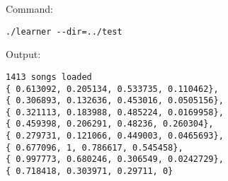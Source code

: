 Command:
\begin{verbatim}
./learner --dir=../test
\end{verbatim}
Output:
\begin{verbatim}
1413 songs loaded
{ 0.613092, 0.205134, 0.533735, 0.110462},
{ 0.306893, 0.132636, 0.453016, 0.0505156}, 
{ 0.321113, 0.183988, 0.485224, 0.0169958}, 
{ 0.459398, 0.206291, 0.48236, 0.260304}, 
{ 0.279731, 0.121066, 0.449003, 0.0465693}, 
{ 0.677096, 1, 0.786617, 0.545458}, 
{ 0.997773, 0.680246, 0.306549, 0.0242729}, 
{ 0.718418, 0.303971, 0.29711, 0}
\end{verbatim}
